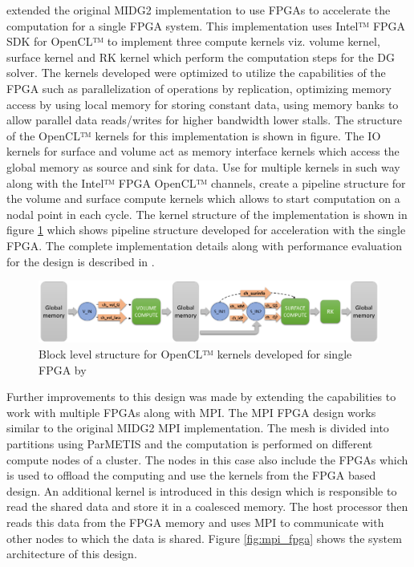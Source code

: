 \textcite{kenter_opencl-based_2018} extended the original MIDG2 implementation to use
FPGAs to accelerate the computation for a single FPGA system. This implementation
uses Intel™ FPGA SDK for OpenCL™ to implement three compute kernels viz. volume kernel,
surface kernel and RK kernel which perform the computation steps for the \ac{DG} solver.
The kernels developed were optimized to utilize the capabilities of the FPGA such
as parallelization of operations by replication, optimizing memory access by using
local memory for storing constant data, using memory banks to allow parallel data
reads/writes for higher bandwidth lower stalls.
The structure of the OpenCL™ kernels for this implementation is shown in figure.
The IO kernels for surface and volume act as memory interface kernels which
access the global memory as source and sink for data. Use for multiple
kernels in such way along with the Intel™ FPGA OpenCL™
channels, create a pipeline structure for the volume and surface compute kernels
which allows to start computation on a nodal point in each cycle. The kernel
structure of the implementation is shown in figure \ref{fig:singlefpga_kernstruc}
which shows pipeline structure developed for acceleration with the single FPGA.
The complete implementation details along with performance evaluation for the design
is described in \cite{kenter_opencl-based_2018}.

\begin{figure}[h]%
    \centering
    \includegraphics[width=1.0\textwidth]{images/nb_kernstruc}
    \caption{Block level structure for OpenCL™ kernels developed for single FPGA by \textcite{kenter_opencl-based_2018}}
    \label{fig:singlefpga_kernstruc}
\end{figure}

Further improvements to this design was made by extending the capabilities to work
with multiple FPGAs along with \ac{MPI}. The \ac{MPI} FPGA design works similar to the original
MIDG2 \ac{MPI} implementation. The mesh is divided into partitions using ParMETIS and
the computation is performed on different compute nodes of a cluster. The nodes
in this case also include the FPGAs which is used to offload the computing and
use the kernels from the FPGA based design. An additional kernel is introduced in
this design which is responsible to read the shared data and store it in a coalesced
memory. The host processor then reads this data from the FPGA memory and uses
\ac{MPI} to communicate with other nodes to which the data is shared. Figure
\ref{fig:mpi_fpga} shows the system architecture of this design.

